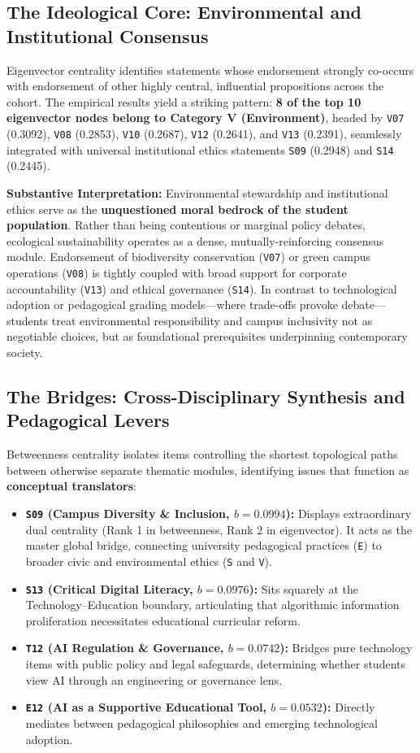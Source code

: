 \documentclass[10pt, a4paper]{article}
\begin{document}
\subsection{The Ideological Core: Environmental and Institutional Consensus}
Eigenvector centrality identifies statements whose endorsement strongly co-occurs with endorsement of other highly central, influential propositions across the cohort. The empirical results yield a striking pattern: \textbf{8 of the top 10 eigenvector nodes belong to Category V (Environment)}, headed by \texttt{V07} (0.3092), \texttt{V08} (0.2853), \texttt{V10} (0.2687), \texttt{V12} (0.2641), and \texttt{V13} (0.2391), seamlessly integrated with universal institutional ethics statements \texttt{S09} (0.2948) and \texttt{S14} (0.2445).

\textbf{Substantive Interpretation:} Environmental stewardship and institutional ethics serve as the \textbf{unquestioned moral bedrock of the student population}. Rather than being contentious or marginal policy debates, ecological sustainability operates as a dense, mutually-reinforcing consensus module. Endorsement of biodiversity conservation (\texttt{V07}) or green campus operations (\texttt{V08}) is tightly coupled with broad support for corporate accountability (\texttt{V13}) and ethical governance (\texttt{S14}). In contrast to technological adoption or pedagogical grading models—where trade-offs provoke debate—students treat environmental responsibility and campus inclusivity not as negotiable choices, but as foundational prerequisites underpinning contemporary society.

\subsection{The Bridges: Cross-Disciplinary Synthesis and Pedagogical Levers}
Betweenness centrality isolates items controlling the shortest topological paths between otherwise separate thematic modules, identifying issues that function as \textbf{conceptual translators}:
\begin{itemize}
    \setlength{\itemsep}{0pt}
    \item \textbf{\texttt{S09} (Campus Diversity \& Inclusion, $b = 0.0994$):} Displays extraordinary dual centrality (Rank 1 in betweenness, Rank 2 in eigenvector). It acts as the master global bridge, connecting university pedagogical practices (\texttt{E}) to broader civic and environmental ethics (\texttt{S} and \texttt{V}).
    \item \textbf{\texttt{S13} (Critical Digital Literacy, $b = 0.0976$):} Sits squarely at the Technology--Education boundary, articulating that algorithmic information proliferation necessitates educational curricular reform.
    \item \textbf{\texttt{T12} (AI Regulation \& Governance, $b = 0.0742$):} Bridges pure technology items with public policy and legal safeguards, determining whether students view AI through an engineering or governance lens.
    \item \textbf{\texttt{E12} (AI as a Supportive Educational Tool, $b = 0.0532$):} Directly mediates between pedagogical philosophies and emerging technological adoption.
\end{itemize}
\end{document}
